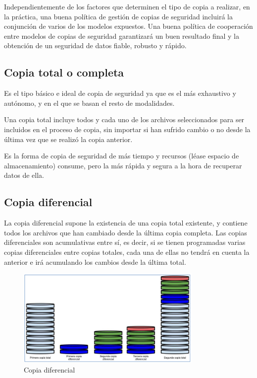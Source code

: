 \documentclass[12pt]{article}
\begin{document}
Independientemente de los factores que determinen el tipo de copia a 
realizar, en la práctica, una buena política de gestión de copias de 
seguridad incluirá la conjunción de varios de los modelos expuestos. Una 
buena política de cooperación entre modelos de copias de seguridad 
garantizará un buen resultado final y la obtención de un seguridad
de datos fiable, robusto y rápido.

\subsection*{Copia total o completa}
Es el tipo básico e ideal de copia de seguridad ya que es el más 
exhaustivo y autónomo, y en el que se basan el resto de modalidades.

Una copia total incluye todos y cada uno de los archivos seleccionados
para ser incluidos en el proceso de copia, sin importar si han 
sufrido cambio o no desde la última vez que se realizó la copia anterior.

Es la forma de copia de seguridad de más tiempo y recursos (léase espacio 
de almacenamiento) consume, pero la más rápida y segura a la hora de 
recuperar datos de ella. 

\subsection*{Copia diferencial}
La copia diferencial supone la existencia de una copia total existente, y
contiene todos los archivos que han cambiado desde la última
copia completa. Las copias diferenciales son acumulativas entre sí, es 
decir, si se tienen programadas varias copias diferenciales entre copias
 totales, cada una de ellas no tendrá en cuenta la anterior e irá 
acumulando los cambios desde la última total.


\begin{figure}[h]
\centering
\includegraphics[width=0.8\textwidth]{diferencial.png}
\renewcommand{\figurename}{Fig.}
\caption{Copia diferencial}
\label{contexto:figura}
\end{figure}
\end{document}
